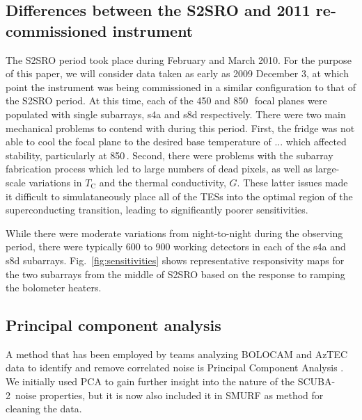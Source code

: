 \documentclass[useAMS,usenatbib,nofootinbib]{mn2e}
\newcommand{\scuba}{SCUBA-2}
\begin{document}
\subsection{Differences between the S2SRO and 2011 re-commissioned instrument}
\label{sec:s2sro}

The S2SRO period took place during February and March 2010. For the
purpose of this paper, we will consider data taken as early as 2009
December 3, at which point the instrument was being commissioned in a
similar configuration to that of the S2SRO period. At this time, each
of the 450 and 850\,\micron\ focal planes were populated with single
subarrays, s4a and s8d respectively. There were two main mechanical
problems to contend with during this period. First, the fridge was not
able to cool the focal plane to the desired base temperature of
... which affected stability, particularly at 850\,\micron. Second,
there were problems with the subarray fabrication process which led to
large numbers of dead pixels, as well as large-scale variations in
$T_\mathrm{C}$ and the thermal conductivity, $G$. These latter issues
made it difficult to simulataneously place all of the TESs into the
optimal region of the superconducting transition, leading to
significantly poorer sensitivities.

While there were moderate variations from night-to-night during the
observing period, there were typically 600 to 900 working detectors in
each of the s4a and s8d subarrays. Fig.~\ref{fig:sensitivities} shows
representative responsivity maps for the two subarrays from the middle
of S2SRO based on the response to ramping the bolometer heaters.

\subsection{Principal component analysis}
\label{sec:pca}

A method that has been employed by teams analyzing BOLOCAM and AzTEC
data to identify and remove correlated noise is Principal Component
Analysis \citep[PCA,][]{laurent2005,scott2008}. We initially used PCA
to gain further insight into the nature of the \scuba\ noise
properties, but it is now also included it in SMURF as method for
cleaning the data.
\end{document}
